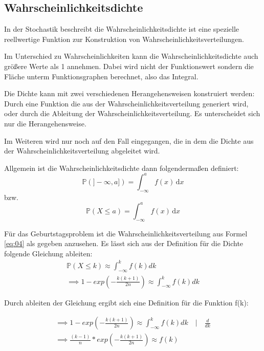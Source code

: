 \documentclass[../main.tex]{subfiles}
\begin{document}
\begin{flushleft}
\subsection{Wahrscheinlichkeitsdichte}

In der Stochastik beschreibt die Wahrscheinlichkeitsdichte ist eine spezielle reellwertige Funktion zur Konstruktion von Wahrscheinlichkeitsverteilungen.

Im Unterschied zu Wahrscheinlichkeiten kann die Wahrscheinlichkeitsdichte auch größere Werte als 1 annehmen. Dabei wird nicht der Funktionswert sondern die Fläche unterm Funktionsgraphen berechnet, also das Integral. \newline

Die Dichte kann mit zwei verschiedenen Herangehensweisen konstruiert werden: Durch eine Funktion die aus der Wahrscheinlichkeitsverteilung generiert wird, oder durch die Ableitung der Wahrscheinlichkeitsverteilung. Es unterscheidet sich nur die Herangehensweise. \newline

Im Weiteren wird nur noch auf den Fall eingegangen, die in dem die Dichte aus der Wahrscheinlichkeitsverteilung abgeleitet wird. \newline

Allgemein ist die Wahrscheinlichkeitsdichte dann folgendermaßen definiert:
\begin{equation}
\mathbb{P}(]-\infty, a])= \int_{-\infty}^a f(x) \, \mathrm d x
\end{equation}
bzw.
\begin{equation}
\mathbb{P}(X \leq a)= \int_{-\infty}^a f(x) \,\mathrm d x
\end{equation}

Für das Geburtstagsproblem ist die Wahrscheinlichkeitsverteilung aus Formel \autoref{eq:04} als gegeben anzusehen. Es lässt sich aus der Definition für die Dichte folgende Gleichung ableiten:
\begin{eqnarray}
\mathbb{P}(X \leq k) \approx \int_{ -\infty }^{ k }{ f(k) dk } \\
\implies 1 - exp( - \frac{ k (k + 1) }{ 2n } ) \approx \int_{ -\infty }^{ k }{ f(k) dk }
\end{eqnarray}

Durch ableiten der Gleichung ergibt sich eine Definition für die Funktion f(k):

\begin{eqnarray}
\implies 1 - exp( - \frac{ k (k + 1) }{ 2n } ) \approx \int_{ -\infty }^{ k }{ f(k) dk } \quad | \quad \frac{ d }{ dk }\\
\implies \frac{ (k-1) }{ n } * exp( - \frac{ k (k + 1) }{ 2n } ) \approx f(k)
\end{eqnarray}


\end{flushleft}
\end{document}
